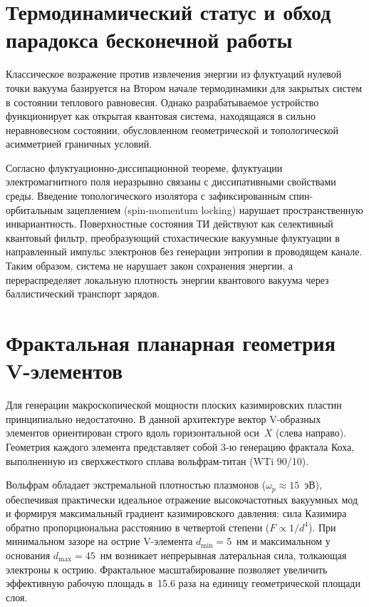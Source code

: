 \documentclass[11pt,a4paper]{article}
\begin{document}
\section{Термодинамический статус и обход парадокса бесконечной работы}

Классическое возражение против извлечения энергии из флуктуаций нулевой точки
вакуума базируется на Втором начале термодинамики для закрытых систем в
состоянии теплового равновесия. Однако разрабатываемое устройство функционирует
как открытая квантовая система, находящаяся в сильно неравновесном состоянии,
обусловленном геометрической и топологической асимметрией граничных условий.

Согласно флуктуационно-диссипационной теореме, флуктуации электромагнитного
поля неразрывно связаны с диссипативными свойствами среды. Введение
топологического изолятора с зафиксированным спин-орбитальным зацеплением
(spin-momentum locking) нарушает пространственную инвариантность. Поверхностные
состояния ТИ действуют как селективный квантовый фильтр, преобразующий
стохастические вакуумные флуктуации в направленный импульс электронов без
генерации энтропии в проводящем канале. Таким образом, система не нарушает
закон сохранения энергии, а перераспределяет локальную плотность энергии
квантового вакуума через баллистический транспорт зарядов.

\section{Фрактальная планарная геометрия V-элементов}

Для генерации макроскопической мощности плоских казимировских пластин
принципиально недостаточно. В данной архитектуре вектор V-образных элементов
ориентирован строго вдоль горизонтальной оси~$X$ (слева направо). Геометрия
каждого элемента представляет собой 3-ю генерацию фрактала Коха, выполненную из
сверхжесткого сплава вольфрам-титан (WTi 90/10).

Вольфрам обладает экстремальной плотностью плазмонов
($\omega_p \approx 15$~эВ), обеспечивая практически идеальное отражение
высокочастотных вакуумных мод и формируя максимальный градиент казимировского
давления: сила Казимира обратно пропорциональна расстоянию в четвертой степени
($F \propto 1/d^4$). При минимальном зазоре на острие V-элемента
$d_{\min} = 5$~нм и максимальном у основания $d_{\max} = 45$~нм возникает
непрерывная латеральная сила, толкающая электроны к острию. Фрактальное
масштабирование позволяет увеличить эффективную рабочую площадь в~15.6 раза на
единицу геометрической площади слоя.
\end{document}
